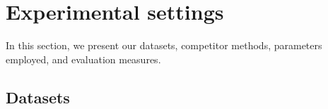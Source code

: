 \documentclass[conference,compsoc]{IEEEtran}
\begin{document}







\section{Experimental settings}
In this section, we present our datasets, competitor methods, parameters employed, and evaluation measures.  
\label{sec:experiments}

\subsection{Datasets}
\end{document}
